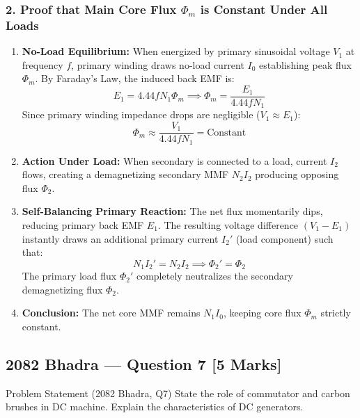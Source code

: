 \documentclass[11pt,a4paper,oneside]{article}
\begin{document}
\subsubsection*{2. Proof that Main Core Flux $\Phi_m$ is Constant Under All Loads}
\begin{enumerate}[leftmargin=1.5em]
  \item \textbf{No-Load Equilibrium:} When energized by primary sinusoidal voltage $V_1$ at frequency $f$, primary winding draws no-load current $I_0$ establishing peak flux $\Phi_m$. By Faraday's Law, the induced back EMF is:
  \begin{equation}
    E_1 = 4.44 f N_1 \Phi_m \implies \Phi_m = \frac{E_1}{4.44 f N_1}
  \end{equation}
  Since primary winding impedance drops are negligible ($V_1 \approx E_1$):
  \begin{equation}
    \Phi_m \approx \frac{V_1}{4.44 f N_1} = \text{Constant}
  \end{equation}
  \item \textbf{Action Under Load:} When secondary is connected to a load, current $I_2$ flows, creating a demagnetizing secondary MMF $N_2 I_2$ producing opposing flux $\Phi_2$.
  \item \textbf{Self-Balancing Primary Reaction:} The net flux momentarily dips, reducing primary back EMF $E_1$. The resulting voltage difference $(V_1 - E_1)$ instantly draws an additional primary current $I_2'$ (load component) such that:
  \begin{equation}
    N_1 I_2' = N_2 I_2 \implies \Phi_2' = \Phi_2
  \end{equation}
  The primary load flux $\Phi_2'$ completely neutralizes the secondary demagnetizing flux $\Phi_2$.
  \item \textbf{Conclusion:} The net core MMF remains $N_1 I_0$, keeping core flux $\Phi_m$ strictly constant.
\end{enumerate}

\newpage

\subsection{2082 Bhadra --- Question 7 [5 Marks]}

\begin{questionbox}{Problem Statement (2082 Bhadra, Q7)}
State the role of commutator and carbon brushes in DC machine. Explain the characteristics of DC generators.
\end{questionbox}
\end{document}
